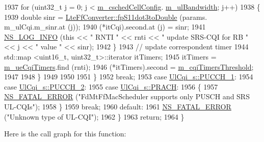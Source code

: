 \begin{DoxyCode}
1937             \textcolor{keywordflow}{for} (uint32\_t j = 0; j < \hyperlink{classns3_1_1FdMtFfMacScheduler_a9f2e3c6bfae8bfc266a84f64e5937ac8}{m\_cschedCellConfig}.
      \hyperlink{structns3_1_1FfMacCschedSapProvider_1_1CschedCellConfigReqParameters_a5ab5b102878e6e7e7727a14af4a64d2f}{m\_ulBandwidth}; j++)
1938               \{
1939                 \textcolor{keywordtype}{double} sinr = \hyperlink{classns3_1_1LteFfConverter_aa5d8c2a8f988dbd63da91818c18666eb}{LteFfConverter::fpS11dot3toDouble} (params.
      m\_ulCqi.m\_sinr.at (j));
1940                 (*itCqi).second.at (j) = sinr;
1941                 \hyperlink{group__logging_gafbd73ee2cf9f26b319f49086d8e860fb}{NS\_LOG\_INFO} (\textcolor{keyword}{this} << \textcolor{stringliteral}{" RNTI "} << rnti << \textcolor{stringliteral}{" update SRS-CQI for RB  "} << j << \textcolor{stringliteral}{"
       value "} << sinr);
1942               \}
1943             \textcolor{comment}{// update correspondent timer}
1944             std::map <uint16\_t, uint32\_t>::iterator itTimers;
1945             itTimers = \hyperlink{classns3_1_1FdMtFfMacScheduler_a673838e77ceb0404b1379674e14802e1}{m\_ueCqiTimers}.find (rnti);
1946             (*itTimers).second = \hyperlink{classns3_1_1FdMtFfMacScheduler_a2594d67e25a125c89b90a5eba5e46cc9}{m\_cqiTimersThreshold};
1947 
1948           \}
1949 
1950 
1951       \}
1952       \textcolor{keywordflow}{break};
1953     \textcolor{keywordflow}{case} \hyperlink{structns3_1_1UlCqi__s_aece9e5ebea42eb9ff1744c72c8459b57a05ca6554bc6fcd96a0a51fbaa8e794c7}{UlCqi\_s::PUCCH\_1}:
1954     \textcolor{keywordflow}{case} \hyperlink{structns3_1_1UlCqi__s_aece9e5ebea42eb9ff1744c72c8459b57a35664b4bda6f1cd6acfe9edc84c7571d}{UlCqi\_s::PUCCH\_2}:
1955     \textcolor{keywordflow}{case} \hyperlink{structns3_1_1UlCqi__s_aece9e5ebea42eb9ff1744c72c8459b57af93f36792cb1eed08f6119e4abfe58e8}{UlCqi\_s::PRACH}:
1956       \{
1957         \hyperlink{group__fatal_ga5131d5e3f75d7d4cbfd706ac456fdc85}{NS\_FATAL\_ERROR} (\textcolor{stringliteral}{"FdMtFfMacScheduler supports only PUSCH and SRS UL-CQIs"});
1958       \}
1959       \textcolor{keywordflow}{break};
1960     \textcolor{keywordflow}{default}:
1961       \hyperlink{group__fatal_ga5131d5e3f75d7d4cbfd706ac456fdc85}{NS\_FATAL\_ERROR} (\textcolor{stringliteral}{"Unknown type of UL-CQI"});
1962     \}
1963   \textcolor{keywordflow}{return};
1964 \}
\end{DoxyCode}


Here is the call graph for this function\+:




